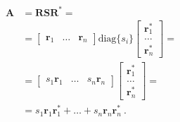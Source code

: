 \documentclass[letterpaper,10pt,english]{jupyterBook}
\begin{document}
\sphinxAtStartPar
{} 
\begin{equation*}
\begin{split}\begin{aligned}
  \mathbf{A}
  & = \mathbf{R} \mathbf{S} \mathbf{R}^* = \\
  & = \begin{bmatrix} \mathbf{r}_1 & \dots & \mathbf{r}_n \end{bmatrix} \text{diag}\{ s_i \} \begin{bmatrix} \mathbf{r}_1^* \\ \dots \\ \mathbf{r}_n^* \end{bmatrix} = \\
  & = \begin{bmatrix} s_1 \mathbf{r}_1 & \dots & s_n \mathbf{r}_n \end{bmatrix} \begin{bmatrix} \mathbf{r}_1^* \\ \dots \\ \mathbf{r}_n^* \end{bmatrix} = \\
  & = s_1 \mathbf{r}_1 \mathbf{r}_1^* + \dots + s_n \mathbf{r}_n \mathbf{r}_n^* \ .
\end{aligned}\end{split}
\end{equation*}
\sphinxAtStartPar
{}
\end{document}
